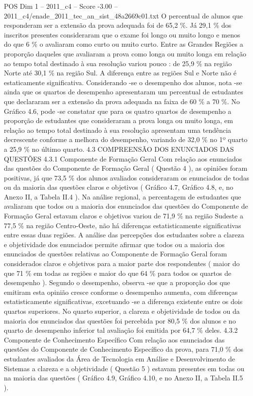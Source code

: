 \begin{textsample}{POS Dim 1 – 2011\_c4 – Score -3.00 – 2011\_c4/enade\_2011\_tec\_an\_sist\_48a2669c01.txt}
O percentual de alunos que responderam ser a extensão da prova adequada foi de 65,2 \%.
Já 29,1 \% dos inscritos presentes consideraram que o exame foi longo ou muito longo e menos do que 6 \% o avaliaram como curto ou muito curto.
Entre as Grandes Regiões a proporção daqueles que avaliaram a prova como longa ou muito longa em relação ao tempo total destinado à sua resolução variou pouco : de 25,9 \% na região Norte até 30,1 \% na região Sul.
A diferença entre as regiões Sul e Norte não é estaticamente significativa.
Considerando -se o desempenho dos alunos, nota -se ainda que os quartos de desempenho apresentaram um percentual de estudantes que declararam ser a extensão da prova adequada na faixa de 60 \% a 70 \%.
No Gráfico 4.6, pode -se constatar que para os quatro quartos de desempenho a proporção de estudantes que consideraram a prova longa ou muito longa, em relação ao tempo total destinado à sua resolução apresentam uma tendência decrescente conforme a melhora do desempenho, variando de 32,0 \% no 1º quarto a 25,9 \% no último quarto. 4.3 COMPREENSÃO DOS ENUNCIADOS DAS QUESTÕES 4.3.1 Componente de Formação Geral Com relação aos enunciados das questões do Componente de Formação Geral ( Questão 4 ), as opiniões foram positivas, já que 73,5 \% dos alunos avaliados consideraram os enunciados de todas ou da maioria das questões claros e objetivos ( Gráfico 4.7, Gráfico 4.8, e, no Anexo II, a Tabela II.4 ).
Na análise regional, a percentagem de estudantes que avaliaram que todos ou a maioria dos enunciados das questões do Componente de Formação Geral estavam claros e objetivos variou de 71,9 \% na região Sudeste a 77,5 \% na região Centro-Oeste, não há diferenças estatisticamente significativas entre essas duas regiões.
A análise das percepções dos estudantes sobre a clareza e objetividade dos enunciados permite afirmar que todos ou a maioria dos enunciados de questões relativas ao Componente de Formação Geral foram considerados claros e objetivos para a maior parte dos respondentes ( maior do que 71 \% em todas as regiões e maior do que 64 \% para todos os quartos de desempenho ).
Segundo o desempenho, observa -se que a proporção dos que emitiram esta opinião cresce conforme o desempenho aumenta, com diferenças estatisticamente significativas, excetuando -se a diferença existente entre os dois quartos superiores.
No quarto superior, a clareza e objetividade de todos ou da maioria dos enunciados das questões foi percebida por 80,5 \% dos alunos e no quarto de desempenho inferior tal avaliação foi emitida por 64,7 \% deles. 4.3.2 Componente de Conhecimento Específico Com relação aos enunciados das questões do Componente de Conhecimento Específico da prova, para 71,0 \% dos estudantes avaliados da Área de Tecnologia em Análise e Desenvolvimento de Sistemas a clareza e a objetividade ( Questão 5 ) estavam presentes em todas ou na maioria das questões ( Gráfico 4.9, Gráfico 4.10, e no Anexo II, a Tabela II.5 ).

\end{textsample}
